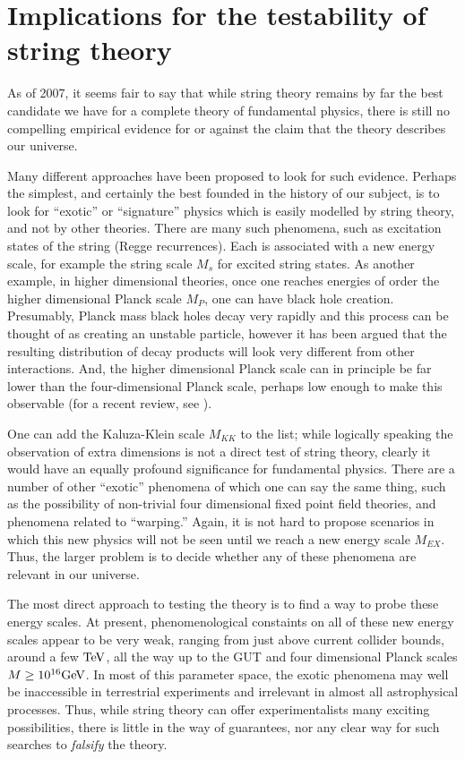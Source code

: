 \documentclass[aps,amsfonts]{ar2e}
\begin{document}
\section{Implications for the testability of string theory}
\label{sec:test}


As of 2007, it seems fair to say that while string theory remains by
far the best candidate we have for a complete theory of fundamental
physics, there is still no compelling empirical evidence for or
against the claim that the theory describes our universe.

Many different approaches have been proposed to look for such
evidence.  Perhaps the simplest, and certainly the best founded in
the history of our subject, is to look for ``exotic'' or
``signature'' physics which is easily modelled by string theory, and
not by other theories.  There are many such phenomena, such as
excitation states of the string (Regge recurrences).  Each is
associated with a new energy scale, for example the string scale
$M_s$ for excited string states.  As another example, in higher
dimensional theories, once one reaches energies of order the higher
dimensional Planck scale $M_P$, one can have black hole creation.
Presumably, Planck mass black holes decay very rapidly and this
process can be thought of as creating an unstable particle, however
it has been argued that the resulting distribution of decay products
will look very different from other interactions.  And, the higher
dimensional Planck scale can in principle be far lower than the
four-dimensional Planck scale, perhaps low enough to make this
observable (for a recent review, see \cite{Landsberg:2006mm}).

One can add the Kaluza-Klein scale $M_{KK}$ to the list; while
logically speaking the observation of extra dimensions is not a
direct test of string theory, clearly it would have an equally
profound significance for fundamental physics.  There are a number
of other ``exotic'' phenomena of which one can say the same thing,
such as the possibility of non-trivial four dimensional fixed point
field theories, and phenomena related to ``warping.''  Again, it is
not hard to propose scenarios in which this new physics will not be
seen until we reach a new energy scale $M_{EX}$.  Thus, the larger
problem is to decide whether any of these phenomena are relevant in
our universe.

The most direct approach to testing the theory is to find a way to
probe these energy scales.  At present, phenomenological constaints on
all of these new energy scales appear to be very weak, ranging from
just above current collider bounds, around a few ${\rm TeV}$, all the way
up to the GUT and four dimensional Planck scales $M \ge 10^{16} {\rm GeV}$.
In
most of this parameter space, the exotic phenomena may well be
inaccessible in terrestrial experiments and irrelevant in almost all
astrophysical processes.  Thus, while string theory can offer
experimentalists many exciting possibilities, there is little in the
way of guarantees, nor any clear way for such searches to \emph{falsify} the
theory.
\end{document}
